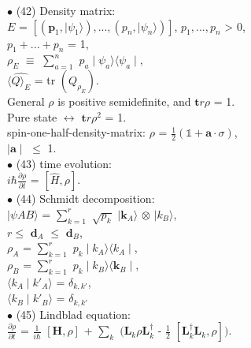 \documentclass[10pt,fancy]{elegantbook}
\begin{document}
{$\bullet$ (42) Density matrix: \\  
$\mathit E$ = $[ (\mathbf p_1, \mid \psi_1 \rangle), ..., ( \mathit p_n, \mid \psi_n \rangle)]$,  
$\mathit p_1,...,\mathit p_n$ > 0, \\ 
$p_1 +...+ p_n$ = 1,  \\    
$\rho_\mathit E$ $\equiv$ $\sum_{a = 1}^n$ $\mathit p_a \mid \psi_a \rangle \langle \psi_a \mid$,  \\   
$\langle \hat{\mathit Q \rangle_\mathit E}$ = tr $ (\mathit Q_{\rho_{\mathit E}})$.  \\    
General $\rho$ is positive semidefinite, and $\mathbf tr \rho$ = 1. \\ 
Pure state $\longleftrightarrow$ $\mathbf tr \rho^2$ = 1.  \\    
spin-one-half-density-matrix: $\rho$ = $\frac{1}{2} ( \mathbb 1 + \mathbf a \cdot \sigma)$,  \\
$\mid \mathbf a \mid$ $\leq$ 1.  \\

$\bullet$ (43) time evolution:  \\
$i \hbar \frac{\partial \rho}{\partial t}$ = $ [ \hat{H}, \rho]$.  \\

$\bullet$ (44) Schmidt decomposition: \\ 
$\mid  \psi AB \rangle$ = $ \sum_{k = 1}^r$ $\sqrt {\mathit p_k}$ $\mid \mathbf k_A \rangle$ $\otimes$ $\mid  \mathit k_B \rangle$,  \\   
$r \leq$ $\mathbf d_A$ $\leq$ $\mathbf d_B$, \\      
$\rho_A$ = $ \sum_{k =1}^r$ $ \mathit p_k \mid \mathit k_A \rangle \langle \mathit k_A \mid$,  \\  
$\rho_B$ = $ \sum_{k =1}^r$ $ \mathit p_k \mid \mathit k_B  \rangle \langle \mathbf k_B \mid$,  \\  
$\langle k_A \mid k'_A \rangle$ = $\delta_{k,k'}$, \\  
$\langle k_B \mid k'_B \rangle$ = $\delta_{k,k'}$  \\

$\bullet$ (45) Lindblad equation:  \\
$\frac{\partial \rho} {\partial t}$ = $\frac{1} {i \hbar}$ $[ \mathbf H, \rho ]$ + $ \sum_k$ $( \mathbf L_k \rho \mathbf L^\dagger_k$ - $\frac{1} {2}$ $[ \mathbf L^\dagger_k \mathbf L_k, \rho])$. \\ 

}
\end{document}
